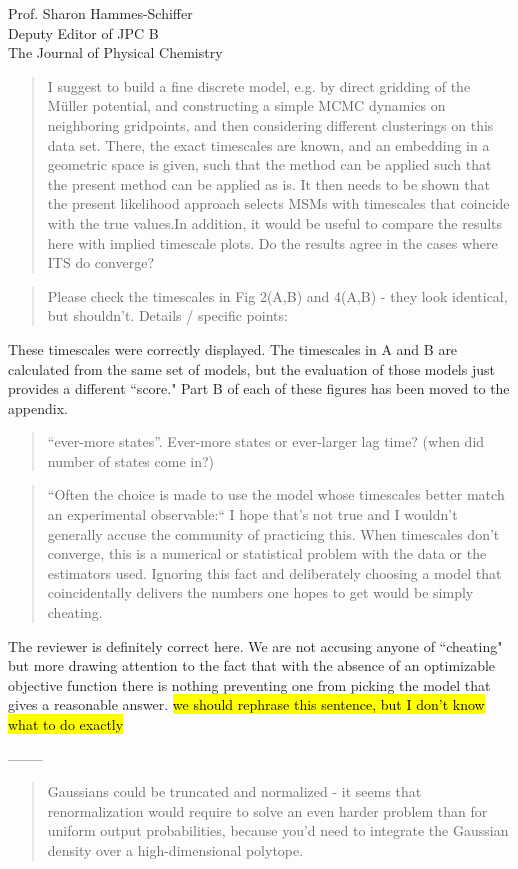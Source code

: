 \documentclass{letter}
\newcommand{\separate}{\begin{center}--------\end{center}}
\begin{document}
\begin{letter}{Prof. Sharon Hammes-Schiffer \\ Deputy Editor of JPC B \\ The Journal of Physical Chemistry}
\begin{quote}
I suggest to build a fine discrete model, e.g. by direct gridding of the M\"uller potential, and constructing a simple MCMC dynamics on neighboring gridpoints, and then considering different clusterings on this data set. There, the exact timescales are known, and an embedding in a geometric space is given, such that the method can be applied such that the present method can be applied as is. It then needs to be shown that the present likelihood approach selects MSMs with timescales that coincide with the true values.In addition, it would be useful to compare the results here with implied timescale plots. Do the results agree in the cases where ITS do converge?
\end{quote}

\begin{quote}
Please check the timescales in Fig 2(A,B) and 4(A,B) - they look identical, but shouldn't. Details / specific points:
\end{quote}

These timescales were correctly displayed. The timescales in A and B are calculated from the same set of models, but the evaluation of those models just provides a different ``score." Part B of each of these figures has been moved to the appendix.

\begin{quote}
``ever-more states''. Ever-more states or ever-larger lag time? (when did number of states come in?)
\end{quote}

\begin{quote}
``Often the choice is made to use the model whose timescales better match an experimental observable:`` I hope that's not true and I wouldn't generally accuse the community of practicing this. When timescales don't converge, this is a numerical or statistical problem with the data or the estimators used. Ignoring this fact and deliberately choosing a model that coincidentally delivers the numbers one hopes to get would be simply cheating.
\end{quote}

The reviewer is definitely correct here. We are not accusing anyone of ``cheating" but more drawing attention to the fact that with the absence of an optimizable objective function there is nothing preventing one from picking the model that gives a reasonable answer. \hl{we should rephrase this sentence, but I don't know what to do exactly}

\separate
\begin{quote}
Gaussians could be truncated and normalized - it seems that renormalization would require to solve an even harder problem than for uniform output probabilities, because you’d need to integrate the Gaussian density over a high-dimensional polytope.
\end{quote}


\end{letter}
\end{document}
